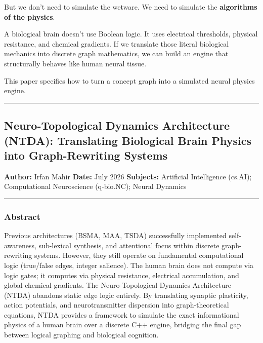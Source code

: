 \documentclass[
  11pt,
  a4paper,
]{article}
\begin{document}
But we don't need to simulate the wetware. We need to simulate the
\textbf{algorithms of the physics}.

A biological brain doesn't use Boolean logic. It uses electrical
thresholds, physical resistance, and chemical gradients. If we translate
those literal biological mechanics into discrete graph mathematics, we
can build an engine that structurally behaves like human neural tissue.

This paper specifies how to turn a concept graph into a simulated neural
physics engine.

\begin{center}\rule{0.5\linewidth}{0.5pt}\end{center}

\subsection{Neuro-Topological Dynamics Architecture (NTDA): Translating
Biological Brain Physics into Graph-Rewriting
Systems}\label{neuro-topological-dynamics-architecture-ntda-translating-biological-brain-physics-into-graph-rewriting-systems}

\textbf{Author:} Irfan Mahir \textbf{Date:} July 2026 \textbf{Subjects:}
Artificial Intelligence (cs.AI); Computational Neuroscience (q-bio.NC);
Neural Dynamics

\begin{center}\rule{0.5\linewidth}{0.5pt}\end{center}

\subsubsection{Abstract}\label{abstract-4}

Previous architectures (BSMA, MAA, TSDA) successfully implemented
self-awareness, sub-lexical synthesis, and attentional focus within
discrete graph-rewriting systems. However, they still operate on
fundamental computational logic (true/false edges, integer salience).
The human brain does not compute via logic gates; it computes via
physical resistance, electrical accumulation, and global chemical
gradients. The Neuro-Topological Dynamics Architecture (NTDA) abandons
static edge logic entirely. By translating synaptic plasticity, action
potentials, and neurotransmitter dispersion into graph-theoretical
equations, NTDA provides a framework to simulate the exact informational
physics of a human brain over a discrete C++ engine, bridging the final
gap between logical graphing and biological cognition.
\end{document}
